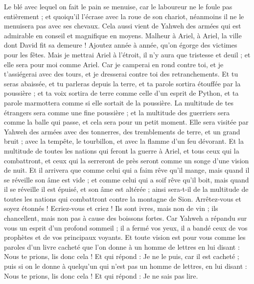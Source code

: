 \begin{multicols}{2}
Le blé avec lequel on fait le pain se menuise, car le laboureur ne le foule pas entièrement ; et quoiqu'il l'écrase avec la roue de son chariot, néanmoins il ne le menuisera pas avec ses chevaux.
Cela aussi vient de Yahweh des armées qui est admirable en conseil et magnifique en moyens.
\VerseOne{}Malheur à Ariel, à Ariel, la ville dont David fit sa demeure ! Ajoutez année à année, qu'on égorge des victimes pour les fêtes.
Mais je mettrai Ariel à l'étroit, il n'y aura que tristesse et deuil ; et elle sera pour moi comme Ariel.
Car je camperai en rond contre toi, et je t'assiégerai avec des tours, et je dresserai contre toi des retranchements.
Et tu seras abaissée, et tu parleras depuis la terre, et ta parole sortira étouffée par la poussière ; et ta voix sortira de terre comme celle d'un esprit de Python, et ta parole marmottera comme si elle sortait de la poussière.
La multitude de tes étrangers sera comme une fine poussière ; et la multitude des guerriers sera comme la balle qui passe, et cela sera pour un petit moment.
Elle sera visitée par Yahweh des armées avec des tonnerres, des tremblements de terre, et un grand bruit ; avec la tempête, le tourbillon, et avec la flamme d'un feu dévorant.
Et la multitude de toutes les nations qui feront la guerre à Ariel, et tous ceux qui la combattront, et ceux qui la serreront de près seront comme un songe d'une vision de nuit.
Et il arrivera que comme celui qui a faim rêve qu'il mange, mais quand il se réveille son âme est vide ; et comme celui qui a soif rêve qu'il boit, mais quand il se réveille il est épuisé, et son âme est altérée ; ainsi sera-t-il de la multitude de toutes les nations qui combattront contre la montagne de Sion.
Arrêtez-vous et soyez étonnés ! Ecriez-vous et criez ! Ils sont ivres, mais non de vin ; ils chancellent, mais non pas à cause des boissons fortes.
Car Yahweh a répandu sur vous un esprit d'un profond sommeil ; il a fermé vos yeux, il a bandé ceux de vos prophètes et de vos principaux voyants.
Et toute vision est pour vous comme les paroles d'un livre cacheté que l'on donne à un homme de lettres en lui disant : Nous te prions, lis donc cela ! Et qui répond : Je ne le puis, car il est cacheté ;
puis si on le donne à quelqu'un qui n'est pas un homme de lettres, en lui disant : Nous te prions, lis donc cela ! Et qui répond : Je ne sais pas lire.

\end{multicols}

